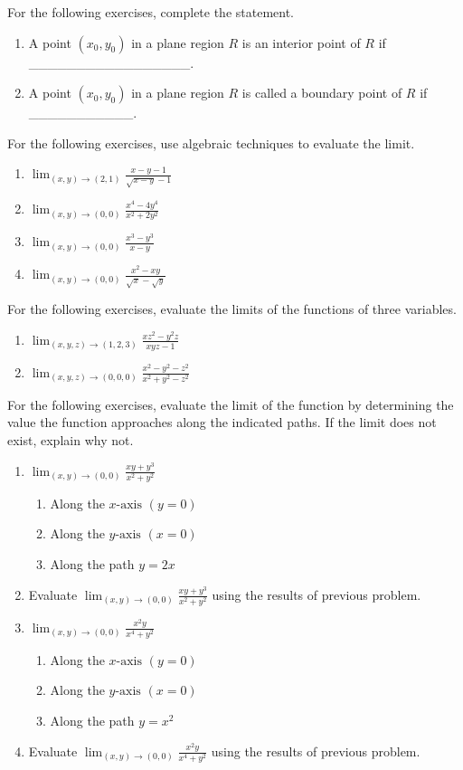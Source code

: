 \documentclass{exercises}
\begin{document}
For the following exercises, complete the statement.

\begin{enumerate}[resume]
\item A point $(x_{0},y_{0})$ in a plane region $R$ is an interior point of $R$ if \_\_\_\_\_\_\_\_\_\_\_\_\_\_\_\_\_.
\item A point $(x_{0},y_{0})$ in a plane region $R$ is called a boundary point of $R$ if \_\_\_\_\_\_\_\_\_\_\_.
\end{enumerate}

For the following exercises, use algebraic techniques to evaluate the limit.

\begin{enumerate}[resume]
\item $\lim_{(x,y)\to(2,1)}\frac{x-y-1}{\sqrt{x-y}-1}$
\item $\lim_{(x,y)\to(0,0)}\frac{x^{4}-4y^{4}}{x^{2}+2y^{2}}$
\item $\lim_{(x,y)\to(0,0)}\frac{x^{3}-y^{3}}{x-y}$
\item $\lim_{(x,y)\to(0,0)}\frac{x^{2}-xy}{\sqrt{x}-\sqrt{y}}$
\end{enumerate}

For the following exercises, evaluate the limits of the functions of three variables.

\begin{enumerate}[resume]
\item $\lim_{(x,y,z)\to(1,2,3)}\frac{xz^{2}-y^{2}z}{xyz-1}$
\item $\lim_{(x,y,z)\to(0,0,0)}\frac{x^{2}-y^{2}-z^{2}}{x^{2}+y^{2}-z^{2}}$
\end{enumerate}

For the following exercises, evaluate the limit of the function by determining the value the function approaches along the indicated paths. If the limit does not exist, explain why not.

\begin{enumerate}[resume]
\item $\lim_{(x,y)\to(0,0)}\frac{xy+y^{3}}{x^{2}+y^{2}}$
\begin{enumerate}[label=(\alph*)]
  \item Along the $x\text{-axis}$ $(y=0)$
  \item Along the $y\text{-axis}$ $(x=0)$
  \item Along the path $y=2x$
\end{enumerate}
\item Evaluate $\lim_{(x,y)\to(0,0)}\frac{xy+y^{3}}{x^{2}+y^{2}}$ using the results of previous problem.
\item $\lim_{(x,y)\to(0,0)}\frac{x^{2}y}{x^{4}+y^{2}}$
\begin{enumerate}[label=(\alph*)]
  \item Along the $x\text{-axis}$ $(y=0)$
  \item Along the $y\text{-axis}$ $(x=0)$
  \item Along the path $y=x^{2}$
\end{enumerate}
\item Evaluate $\lim_{(x,y)\to(0,0)}\frac{x^{2}y}{x^{4}+y^{2}}$ using the results of previous problem.
\end{enumerate}
\end{document}
